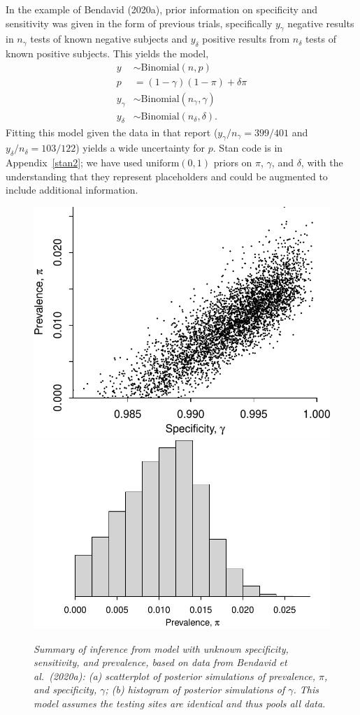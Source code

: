 \documentclass[11pt]{article}
\begin{document}
In the example of Bendavid (2020a), prior information on specificity
and sensitivity was given in the form of previous trials, specifically
$y_{\gamma}$ negative results in $n_{\gamma}$ tests of known negative
subjects and $y_{\delta}$ positive results from $n_{\delta}$ tests of
known positive subjects.  This yields the model,
\begin{align*}
   y & \sim \mbox{Binomial} (n, p)\\
  p & = (1-\gamma)(1- \pi)+ \delta\pi\\
   y_{\gamma} & \sim \mbox{Binomial} (n_{\gamma}, \gamma)\\
   y_{\delta} & \sim \mbox{Binomial} (n_{\delta}, \delta).
\end{align*}
Fitting this model given the data in that report
($y_{\gamma}/n_{\gamma}=399/401$ and $y_{\delta}/n_{\delta}=103/122$)
yields a wide uncertainty for $p$.  Stan code is in
Appendix~\ref{stan2}; we have used $\mbox{uniform}(0,1)$ priors on
$\pi$, $\gamma$, and $\delta$, with the understanding that they
represent placeholders and could be augmented to include additional
information.

\begin{figure}
  \centerline{ \includegraphics[width=.45\textwidth]{img/scatter.pdf}
    \includegraphics[width=.55\textwidth]{img/hist.pdf}}
  \caption{\em Summary of inference from model with unknown
    specificity, sensitivity, and prevalence, based on data from
    Bendavid et al.\ (2020a): (a) scatterplot of posterior simulations
    of prevalence, $\pi$, and specificity, $\gamma$; (b) histogram of
    posterior simulations of $\gamma$.  This model assumes the testing
    sites are identical and thus pools all data.}
\label{posterior1}
\end{figure}
\end{document}
